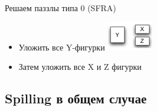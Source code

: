 \documentclass[aspectratio=169
  , xcolor={svgnames}
  , hyperref={ colorlinks,citecolor=DeepPink4
             , linkcolor=DarkRed,urlcolor=DarkBlue}
  , russian
  ]{beamer}
\theoremstyle{exerciseStyle1}
\begin{document}
\begin{frame}[fragile]{Решаем паззлы  типа 0 (SFRA)}
\begin{minipage}{.38\textwidth}
\begin{itemize}
\item Уложить все Y-фигурки
\includegraphics[width=2cm]{figures/puzzles-types-figures}
\item Затем уложить все X и Z фигурки
\end{itemize}
\end{minipage}
\end{frame}


\subsection{Spilling в общем случае}
\end{document}
